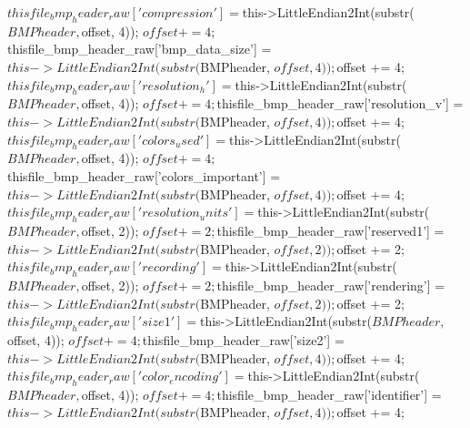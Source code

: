 \begin{DoxyCode}
{{{                                $thisfile_bmp_header_raw['compression']      = 
      $this->LittleEndian2Int(substr($BMPheader, $offset, 4));
                                $offset += 4;
                                $thisfile_bmp_header_raw['bmp_data_size']    = 
      $this->LittleEndian2Int(substr($BMPheader, $offset, 4));
                                $offset += 4;
                                $thisfile_bmp_header_raw['resolution_h']     = 
      $this->LittleEndian2Int(substr($BMPheader, $offset, 4));
                                $offset += 4;
                                $thisfile_bmp_header_raw['resolution_v']     = 
      $this->LittleEndian2Int(substr($BMPheader, $offset, 4));
                                $offset += 4;
                                $thisfile_bmp_header_raw['colors_used']      = 
      $this->LittleEndian2Int(substr($BMPheader, $offset, 4));
                                $offset += 4;
                                $thisfile_bmp_header_raw['colors_important'] = 
      $this->LittleEndian2Int(substr($BMPheader, $offset, 4));
                                $offset += 4;
                                $thisfile_bmp_header_raw['resolution_units'] = 
      $this->LittleEndian2Int(substr($BMPheader, $offset, 2));
                                $offset += 2;
                                $thisfile_bmp_header_raw['reserved1']        = 
      $this->LittleEndian2Int(substr($BMPheader, $offset, 2));
                                $offset += 2;
                                $thisfile_bmp_header_raw['recording']        = 
      $this->LittleEndian2Int(substr($BMPheader, $offset, 2));
                                $offset += 2;
                                $thisfile_bmp_header_raw['rendering']        = 
      $this->LittleEndian2Int(substr($BMPheader, $offset, 2));
                                $offset += 2;
                                $thisfile_bmp_header_raw['size1']            = 
      $this->LittleEndian2Int(substr($BMPheader, $offset, 4));
                                $offset += 4;
                                $thisfile_bmp_header_raw['size2']            = 
      $this->LittleEndian2Int(substr($BMPheader, $offset, 4));
                                $offset += 4;
                                $thisfile_bmp_header_raw['color_encoding']   = 
      $this->LittleEndian2Int(substr($BMPheader, $offset, 4));
                                $offset += 4;
                                $thisfile_bmp_header_raw['identifier']       = 
      $this->LittleEndian2Int(substr($BMPheader, $offset, 4));
                                $offset += 4;

}}}
\end{DoxyCode}
